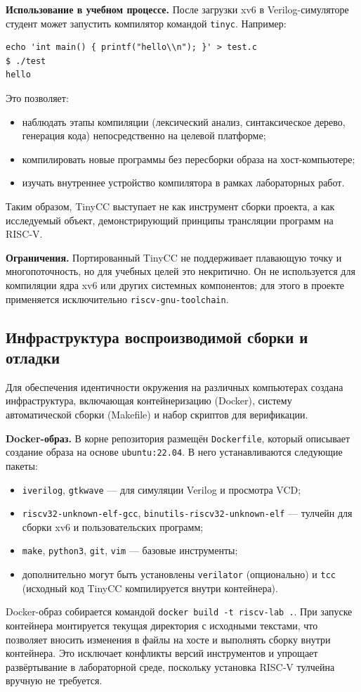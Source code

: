 \textbf{Использование в учебном процессе.} После загрузки xv6 в Verilog-симуляторе студент может запустить компилятор командой \texttt{tinyc}. Например:
\begin{verbatim}
echo 'int main() { printf("hello\\n"); }' > test.c
$ ./test
hello
\end{verbatim}
Это позволяет:
\begin{itemize}
\item наблюдать этапы компиляции (лексический анализ, синтаксическое дерево, генерация кода) непосредственно на целевой платформе;
\item компилировать новые программы без пересборки образа на хост-компьютере;
\item изучать внутреннее устройство компилятора в рамках лабораторных работ.
\end{itemize}
Таким образом, TinyCC выступает не как инструмент сборки проекта, а как исследуемый объект, демонстрирующий принципы трансляции программ на RISC‑V.

\textbf{Ограничения.} Портированный TinyCC не поддерживает плавающую точку и многопоточность, но для учебных целей это некритично. Он не используется для компиляции ядра xv6 или других системных компонентов; для этого в проекте применяется исключительно \texttt{riscv-gnu-toolchain}.

\subsection{Инфраструктура воспроизводимой сборки и отладки}

Для обеспечения идентичности окружения на различных компьютерах создана инфраструктура, включающая контейнеризацию (Docker), систему автоматической сборки (Makefile) и набор скриптов для верификации.

\textbf{Docker-образ.} В корне репозитория размещён \texttt{Dockerfile}, который описывает создание образа на основе \texttt{ubuntu:22.04}. В него устанавливаются следующие пакеты:
\begin{itemize}
  \item \texttt{iverilog}, \texttt{gtkwave} — для симуляции Verilog и просмотра VCD;
  \item \texttt{riscv32-unknown-elf-gcc}, \texttt{binutils-riscv32-unknown-elf} — тулчейн для сборки xv6 и пользовательских программ;
  \item \texttt{make}, \texttt{python3}, \texttt{git}, \texttt{vim} — базовые инструменты;
  \item дополнительно могут быть установлены \texttt{verilator} (опционально) и \texttt{tcc} (исходный код TinyCC компилируется внутри контейнера).
\end{itemize}
Docker-образ собирается командой \texttt{docker build -t riscv-lab .}. При запуске контейнера монтируется текущая директория с исходными текстами, что позволяет вносить изменения в файлы на хосте и выполнять сборку внутри контейнера. Это исключает конфликты версий инструментов и упрощает развёртывание в лабораторной среде, поскольку установка RISC‑V тулчейна вручную не требуется.

